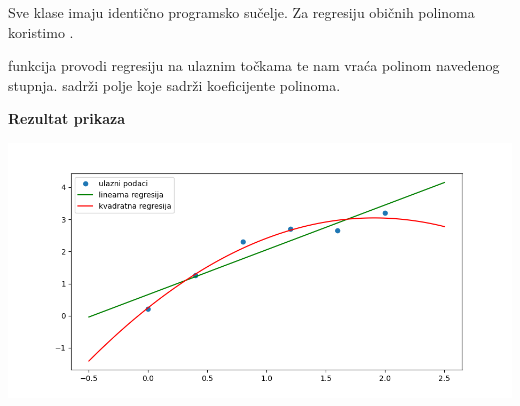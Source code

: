 \noindent
Sve klase imaju identično programsko sučelje. Za regresiju običnih polinoma
koristimo .

 funkcija provodi regresiju na
ulaznim točkama te nam vraća polinom navedenog stupnja. 
sadrži  polje koje sadrži koeficijente polinoma.



\textbf{Rezultat prikaza}

\noindent
\includegraphics[width=\linewidth]{fig/regresija.png}

